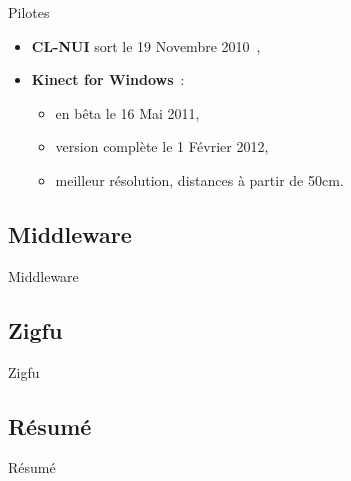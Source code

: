 \begin{frame}{Pilotes}
{\begin{itemize}
    \item<3-> \textbf{CL-NUI} sort le 19 Novembre 2010~\cite{clnui},
    \item<4-> \textbf{Kinect for Windows}~:
  {
    \begin{itemize}
      \item en bêta le 16 Mai 2011,
      \item version complète le 1 Février 2012,
      \item meilleur résolution, distances à partir de 50cm.
    \end{itemize}
  }
  \end{itemize}
  \vfill
}
\end{frame}

\subsection{Middleware}
\begin{frame}{Middleware}
\end{frame}

\subsection{Zigfu}
\begin{frame}{Zigfu}
\end{frame}

\subsection{Résumé}
\begin{frame}{Résumé}
\end{frame}